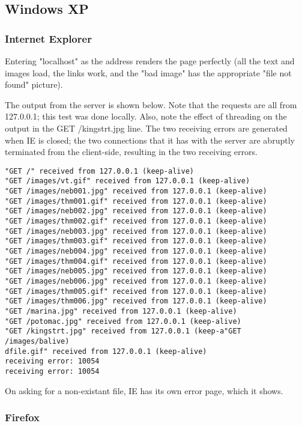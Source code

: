 \documentclass[11pt]{report}
\begin{document}
\subsection{Windows XP}

\subsubsection{Internet Explorer}

Entering "localhost" as the address renders the page perfectly (all the text and images load, the links work, and the "bad image" has the appropriate "file not found" picture). 

The output from the server is shown below. Note that the requests are all from 127.0.0.1; this test was done locally. Also, note the effect of threading on the output in the GET /kingstrt.jpg line. The two receiving errors are generated when IE is closed; the two connections that it has with the server are abruptly terminated from the client-side, resulting in the two receiving errors.

\begin{verbatim}
"GET /" received from 127.0.0.1 (keep-alive)
"GET /images/vt.gif" received from 127.0.0.1 (keep-alive)
"GET /images/neb001.jpg" received from 127.0.0.1 (keep-alive)
"GET /images/thm001.gif" received from 127.0.0.1 (keep-alive)
"GET /images/neb002.jpg" received from 127.0.0.1 (keep-alive)
"GET /images/thm002.gif" received from 127.0.0.1 (keep-alive)
"GET /images/neb003.jpg" received from 127.0.0.1 (keep-alive)
"GET /images/thm003.gif" received from 127.0.0.1 (keep-alive)
"GET /images/neb004.jpg" received from 127.0.0.1 (keep-alive)
"GET /images/thm004.gif" received from 127.0.0.1 (keep-alive)
"GET /images/neb005.jpg" received from 127.0.0.1 (keep-alive)
"GET /images/neb006.jpg" received from 127.0.0.1 (keep-alive)
"GET /images/thm005.gif" received from 127.0.0.1 (keep-alive)
"GET /images/thm006.jpg" received from 127.0.0.1 (keep-alive)
"GET /marina.jpg" received from 127.0.0.1 (keep-alive)
"GET /potomac.jpg" received from 127.0.0.1 (keep-alive)
"GET /kingstrt.jpg" received from 127.0.0.1 (keep-a"GET /images/balive)
dfile.gif" received from 127.0.0.1 (keep-alive)
receiving error: 10054
receiving error: 10054
\end{verbatim}

On asking for a non-existant file, IE has its own error page, which it shows.

\subsubsection{Firefox}
\end{document}
